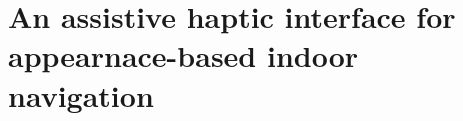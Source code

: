 \chapter{An assistive haptic interface for appearnace-based indoor navigation}\label{ch:assistiveapp}
